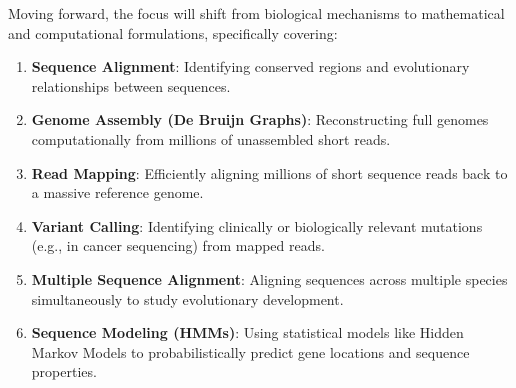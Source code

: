 Moving forward, the focus will shift from biological mechanisms to mathematical and computational formulations, specifically covering:
\begin{enumerate}
  \item \textbf{Sequence Alignment}: Identifying conserved regions and evolutionary relationships between sequences.
  \item \textbf{Genome Assembly (De Bruijn Graphs)}: Reconstructing full genomes computationally from millions of unassembled short reads.
  \item \textbf{Read Mapping}: Efficiently aligning millions of short sequence reads back to a massive reference genome.
  \item \textbf{Variant Calling}: Identifying clinically or biologically relevant mutations (e.g., in cancer sequencing) from mapped reads.
  \item \textbf{Multiple Sequence Alignment}: Aligning sequences across multiple species simultaneously to study evolutionary development.
  \item \textbf{Sequence Modeling (HMMs)}: Using statistical models like Hidden Markov Models to probabilistically predict gene locations and sequence properties.
\end{enumerate}

